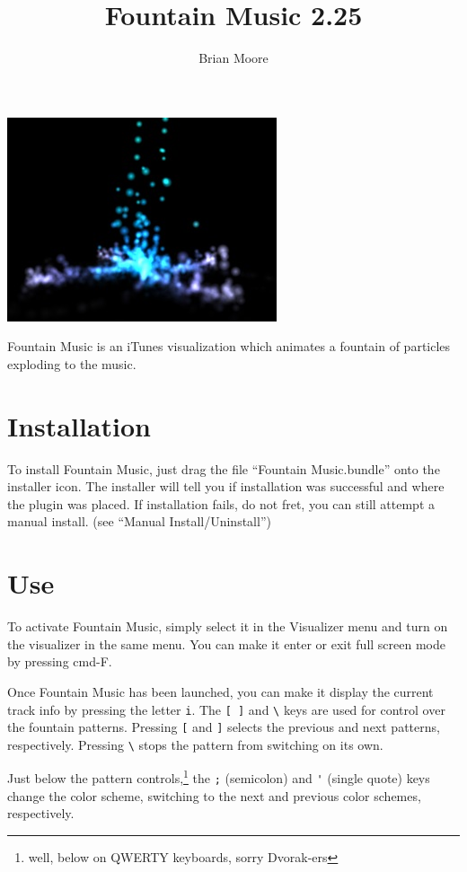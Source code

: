 \documentclass[11pt]{article}
\title{Fountain Music 2.25}
\author{Brian Moore}
\begin{document}
\ifpdf
{}
\else
{}
\fi

\maketitle
\begin{center}
\includegraphics{fmimage.jpg}
\end{center}

Fountain Music is an iTunes visualization which animates a fountain of particles exploding to the music.

\section*{Installation}
To install Fountain Music, just drag the file ``Fountain Music.bundle'' onto the installer icon.  The installer will tell you if installation was successful and where the plugin was placed.  If installation fails, do not fret, you can still attempt a manual install. (see ``Manual Install/Uninstall'')

\section*{Use}
To activate Fountain Music, simply select it in the Visualizer menu and turn on the visualizer in the same menu.  You can make it enter or exit full screen mode by pressing  cmd-F.

Once Fountain Music has been launched, you can make it display the current track info by pressing the letter \verb|i|. The \verb|[ ]| and \verb|\| keys are used for control over the fountain patterns.  Pressing \verb|[| and \verb|]| selects the previous and next patterns, respectively. Pressing \verb|\| stops the pattern from switching on its own.

Just below the pattern controls,\footnote{well, below on QWERTY keyboards, sorry Dvorak-ers} the \verb|;| (semicolon) and \verb|'| (single quote) keys change the color scheme, switching to the next and previous color schemes, respectively.
\end{document}
